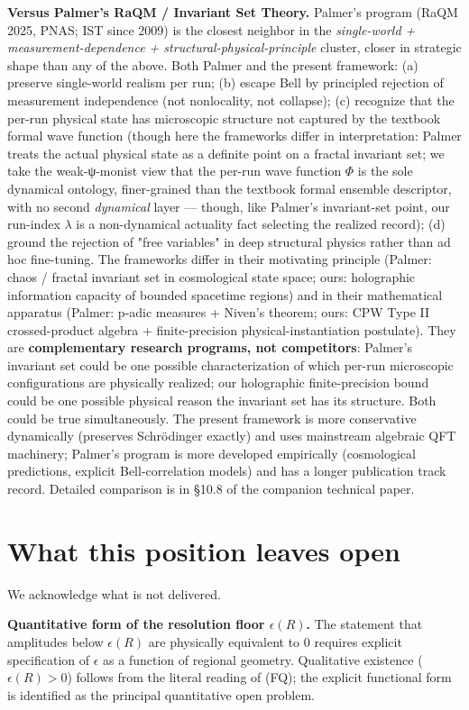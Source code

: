 \documentclass[11pt,a4paper]{article}
\begin{document}
\textbf{Versus Palmer's RaQM / Invariant Set Theory.} Palmer's program (RaQM 2025, PNAS; IST since 2009) is the closest neighbor in the \emph{single-world + measurement-dependence + structural-physical-principle} cluster, closer in strategic shape than any of the above. Both Palmer and the present framework: (a) preserve single-world realism per run; (b) escape Bell by principled rejection of measurement independence (not nonlocality, not collapse); (c) recognize that the per-run physical state has microscopic structure not captured by the textbook formal wave function (though here the frameworks differ in interpretation: Palmer treats the actual physical state as a definite point on a fractal invariant set; we take the weak-ψ-monist view that the per-run wave function $\Phi$ is the sole dynamical ontology, finer-grained than the textbook formal ensemble descriptor, with no second \emph{dynamical} layer — though, like Palmer's invariant-set point, our run-index $\lambda$ is a non-dynamical actuality fact selecting the realized record); (d) ground the rejection of "free variables" in deep structural physics rather than ad hoc fine-tuning. The frameworks differ in their motivating principle (Palmer: chaos / fractal invariant set in cosmological state space; ours: holographic information capacity of bounded spacetime regions) and in their mathematical apparatus (Palmer: p-adic measures + Niven's theorem; ours: CPW Type II crossed-product algebra + finite-precision physical-instantiation postulate). They are \textbf{complementary research programs, not competitors}: Palmer's invariant set could be one possible characterization of which per-run microscopic configurations are physically realized; our holographic finite-precision bound could be one possible physical reason the invariant set has its structure. Both could be true simultaneously. The present framework is more conservative dynamically (preserves Schrödinger exactly) and uses mainstream algebraic QFT machinery; Palmer's program is more developed empirically (cosmological predictions, explicit Bell-correlation models) and has a longer publication track record. Detailed comparison is in §10.8 of the companion technical paper.

\section{What this position leaves open}

We acknowledge what is not delivered.

\textbf{Quantitative form of the resolution floor $\epsilon(R)$.} The statement that amplitudes below $\epsilon(R)$ are physically equivalent to $0$ requires explicit specification of $\epsilon$ as a function of regional geometry. Qualitative existence ($\epsilon(R) > 0$) follows from the literal reading of (FQ); the explicit functional form is identified as the principal quantitative open problem.
\end{document}
